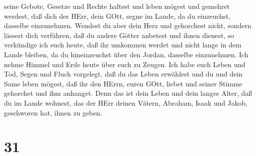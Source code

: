 seine Gebote, Gesetze und Rechte haltest und leben mögest und gemehret
werdest, daß dich der HErr, dein GOtt, segne im Lande, da du einzeuchst,
dasselbe einzunehmen.  Wendest du aber dein Herz und
gehorchest nicht, sondern lässest dich verführen, daß du andere Götter
anbetest und ihnen dienest,  so verkündige ich euch heute,
daß ihr umkommen werdet und nicht lange in dem Lande bleiben, da du
hineinzeuchst über den Jordan, dasselbe einzunehmen.  Ich
nehme Himmel und Erde heute über euch zu Zeugen. Ich habe euch Leben und
Tod, Segen und Fluch vorgelegt, daß du das Leben erwählest und du und
dein Same leben mögest,  daß ihr den HErrn, euren GOtt,
liebet und seiner Stimme gehorchet und ihm anhanget. Denn das ist dein
Leben und dein langes Alter, daß du im Lande wohnest, das der HErr
deinen Vätern, Abraham, Isaak und Jakob, geschworen hat, ihnen zu geben.

\hypertarget{section-30}{%
\section{31}\label{section-30}}

